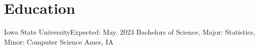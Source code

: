 \section{Education}
  \resumeSubHeadingListStart
    \resumeSubheading
      {Iowa State University}{Expected: May. 2023}
      {Bachelors of Science, Major: Statistics, Minor: Computer Science }{Ames, IA}
        \resumeItemListStart
        \resumeItemListEnd
  \resumeSubHeadingListEnd
